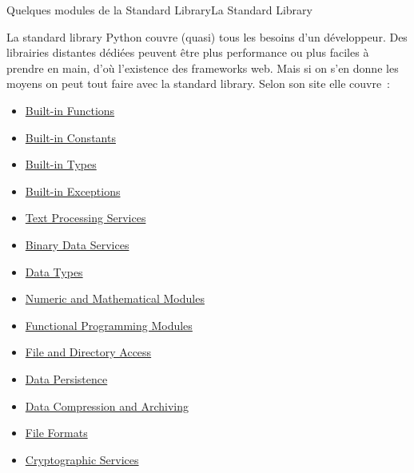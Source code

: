 \documentclass{beamer}
\begin{document}
    \begin{frame}{Quelques modules de la Standard Library}{La Standard Library}
        \begin{tiny}
            La standard library Python couvre (quasi) tous les besoins d'un développeur.
            Des librairies distantes dédiées peuvent être plus performance ou plus faciles à prendre en main, d'où l'existence des frameworks web.
            Mais si on s'en donne les moyens on peut tout faire avec la standard library.
            \bigbreak
            Selon son site elle couvre~:

            \begin{itemize}
                \item \href{https://docs.python.org/3/library/functions.html}{Built-in Functions}
                \item \href{https://docs.python.org/3/library/constants.html}{Built-in Constants}
                \item \href{https://docs.python.org/3/library/stdtypes.html}{Built-in Types}
                \item \href{https://docs.python.org/3/library/exceptions.html}{Built-in Exceptions}
                \item \href{https://docs.python.org/3/library/text.html}{Text Processing Services}
                \item \href{https://docs.python.org/3/library/binary.html}{Binary Data Services}
                \item \href{https://docs.python.org/3/library/datatypes.html}{Data Types}
                \item \href{https://docs.python.org/3/library/numeric.html}{Numeric and Mathematical Modules}
                \item \href{https://docs.python.org/3/library/functional.html}{Functional Programming Modules}
                \item \href{https://docs.python.org/3/library/filesys.html}{File and Directory Access}
                \item \href{https://docs.python.org/3/library/persistence.html}{Data Persistence}
                \item \href{https://docs.python.org/3/library/archiving.html}{Data Compression and Archiving}
                \item \href{https://docs.python.org/3/library/fileformats.html}{File Formats}
                \item \href{https://docs.python.org/3/library/crypto.html}{Cryptographic Services}

\end{itemize}
\end{tiny}
\end{frame}
\end{document}
